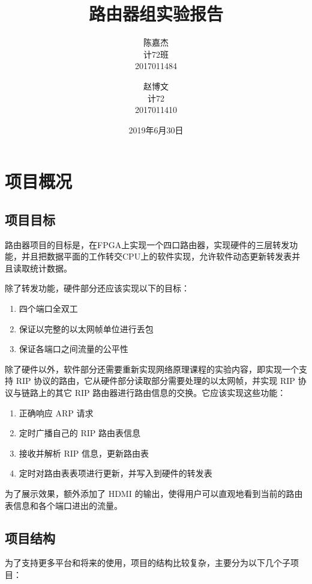 \documentclass{ctexart}
\newcommand{\tmaffiliation}[1]{\\ #1}
\begin{document}
\title{路由器组实验报告}

\author{
  陈嘉杰
  \tmaffiliation{计72班\\
  2017011484}
  \and
  赵博文
  \tmaffiliation{计72\\
  2017011410}
}
\date{2019年6月30日}
\maketitle
\tableofcontents

\section{项目概况}
\subsection{项目目标}
  路由器项目的目标是，在FPGA上实现一个四口路由器，实现硬件的三层转发功能，并且把数据平面的工作转交CPU上的软件实现，允许软件动态更新转发表并且读取统计数据。

  除了转发功能，硬件部分还应该实现以下的目标：

  \begin{enumerate}
    \item 四个端口全双工
    \item 保证以完整的以太网帧单位进行丢包
    \item 保证各端口之间流量的公平性
  \end{enumerate}

  除了硬件以外，软件部分还需要重新实现网络原理课程的实验内容，即实现一个支持 RIP 协议的路由，它从硬件部分读取部分需要处理的以太网帧，并实现 RIP 协议与链路上的其它 RIP 路由器进行路由信息的交换。它应该实现这些功能：

  \begin{enumerate}
    \item 正确响应 ARP 请求
    \item 定时广播自己的 RIP 路由表信息
    \item 接收并解析 RIP 信息，更新路由表
    \item 定时对路由表表项进行更新，并写入到硬件的转发表
  \end{enumerate}

  为了展示效果，额外添加了 HDMI 的输出，使得用户可以直观地看到当前的路由表信息和各个端口进出的流量。

\subsection{项目结构}
  为了支持更多平台和将来的使用，项目的结构比较复杂，主要分为以下几个子项目：
\end{document}
